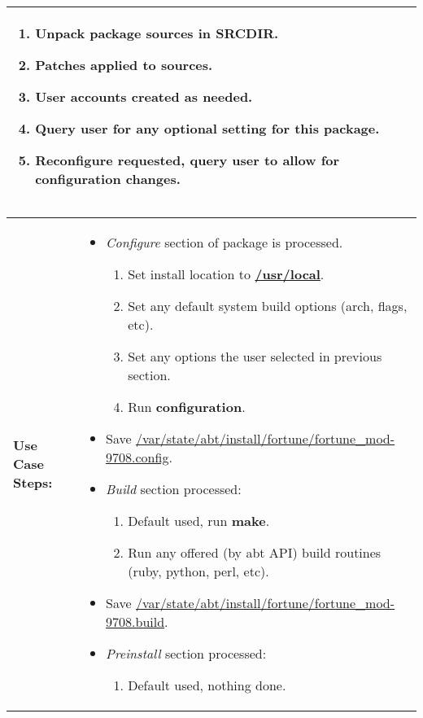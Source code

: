 \begin{tabularx}{\linewidth}{|l|X|}
\begin{minipage}{\linewidth}
\begin{itemize}
\begin{enumerate}
      \item Unpack package sources in \textbf{SRCDIR}.
      \item Patches applied to sources.
      \item User accounts created as needed.
      \item Query user for any optional setting for this package.
      \item Reconfigure requested, query user to allow for configuration changes.
    \end{enumerate}
  \end{itemize}
  \vspace{0.05em}
\end{minipage}
\\
\hline 
\end{tabularx}

\begin{tabularx}{\linewidth}{|l|X|}
\hline
\textbf{Use Case Steps:} & 
\begin{minipage}{\linewidth}
  \vspace{0.05em}
  \begin{itemize}
    \item \emph{Configure} section of package is processed.
    \begin{enumerate}
      \item Set install location to \textbf{\url{/usr/local}}.
      \item Set any default system build options (arch, flags, etc).
      \item Set any options the user selected in previous section.
      \item Run \textbf{configuration}.
    \end{enumerate}
    \item Save \url{/var/state/abt/install/fortune/fortune_mod-9708.config}.
    \item \emph{Build} section processed:
    \begin{enumerate}
      \item Default used, run \textbf{make}.
      \item Run any offered (by abt API) build routines (ruby, python, perl, etc).
    \end{enumerate}
    \item Save \url{/var/state/abt/install/fortune/fortune_mod-9708.build}.
    \item \emph{Preinstall} section processed:
    \begin{enumerate}
      \item Default used, nothing done.

\end{enumerate}
\end{itemize}
\end{minipage}
\end{tabularx}
